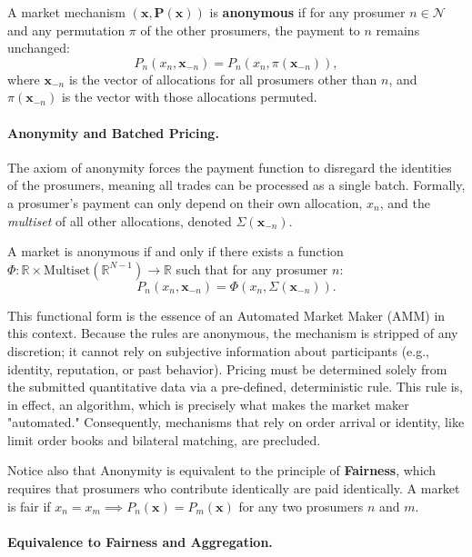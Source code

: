 \documentclass[12pt, notitlepage]{article}
\begin{document}
\begin{axiom}[Anonymity]
\label{def:anonymity}
A market mechanism $(\bm{x}, \bm{P}(\bm{x}))$ is \textbf{anonymous} if for any prosumer $n \in \mathcal{N}$ and any permutation $\pi$ of the other prosumers, the payment to $n$ remains unchanged:
\[
P_n(x_n, \bm{x}_{-n}) = P_n(x_n, \pi(\bm{x}_{-n})),
\]
where $\bm{x}_{-n}$ is the vector of allocations for all prosumers other than $n$, and $\pi(\bm{x}_{-n})$ is the vector with those allocations permuted.
\end{axiom}

\paragraph{Anonymity and Batched Pricing.}
The axiom of anonymity forces the payment function to disregard the identities of the prosumers, meaning all trades can be processed as a single batch. Formally, a prosumer's payment can only depend on their own allocation, $x_n$, and the \textit{multiset} of all other allocations, denoted $\Sigma(\bm{x}_{-n})$. 

\begin{proposition} \label{prop:anonimity}
A market is anonymous if and only if there exists a function $\Phi: \mathbb{R} \times \mathrm{Multiset}(\mathbb{R}^{N-1}) \to \mathbb{R}$ such that for any prosumer $n$:
\[
P_n(x_n, \bm{x}_{-n}) = \Phi(x_n, \Sigma(\bm{x}_{-n})).
\]
\end{proposition}

This functional form is the essence of an Automated Market Maker (AMM) in this context. Because the rules are anonymous, the mechanism is stripped of any discretion; it cannot rely on subjective information about participants (e.g., identity, reputation, or past behavior). Pricing must be determined solely from the submitted quantitative data via a pre-defined, deterministic rule. This rule is, in effect, an algorithm, which is precisely what makes the market maker "automated." Consequently, mechanisms that rely on order arrival or identity, like limit order books and bilateral matching, are precluded. 

Notice also that Anonymity is equivalent to the principle of \textbf{Fairness}, which requires that prosumers who contribute identically are paid identically. A market is fair if $x_n = x_m \implies P_n(\bm{x}) = P_m(\bm{x})$ for any two prosumers $n$ and $m$.

\paragraph{Equivalence to Fairness and Aggregation.}
\end{document}
